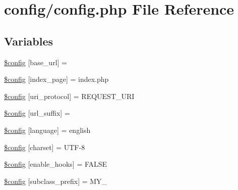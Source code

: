 \hypertarget{application_2config_2config_8php}{}\section{config/config.php File Reference}
\label{application_2config_2config_8php}
\subsection*{Variables}
\begin{DoxyCompactItemize}
\item 
\mbox{\hyperlink{application_2config_2config_8php_ab7d3dc1aba181a1198e7f26609046673}{\$config}} \mbox{[}\textquotesingle{}base\+\_\+url\textquotesingle{}\mbox{]} = \textquotesingle{}\textquotesingle{}
\item 
\mbox{\hyperlink{application_2config_2config_8php_a58f062e2a0bc777dad9a430970a7e50b}{\$config}} \mbox{[}\textquotesingle{}index\+\_\+page\textquotesingle{}\mbox{]} = \textquotesingle{}index.\+php\textquotesingle{}
\item 
\mbox{\hyperlink{application_2config_2config_8php_a7e0a80976b25629e97a7c93f1d278d99}{\$config}} \mbox{[}\textquotesingle{}uri\+\_\+protocol\textquotesingle{}\mbox{]} = \textquotesingle{}R\+E\+Q\+U\+E\+S\+T\+\_\+\+U\+RI\textquotesingle{}
\item 
\mbox{\hyperlink{application_2config_2config_8php_ad1183c73fa84c832075d7220c49dc6b2}{\$config}} \mbox{[}\textquotesingle{}url\+\_\+suffix\textquotesingle{}\mbox{]} = \textquotesingle{}\textquotesingle{}
\item 
\mbox{\hyperlink{application_2config_2config_8php_a36e8d14df9a48c1e0945975109946e8b}{\$config}} \mbox{[}\textquotesingle{}language\textquotesingle{}\mbox{]} = \textquotesingle{}english\textquotesingle{}
\item 
\mbox{\hyperlink{application_2config_2config_8php_a071d6716931a0a13a16629257e9ef345}{\$config}} \mbox{[}\textquotesingle{}charset\textquotesingle{}\mbox{]} = \textquotesingle{}U\+TF-\/8\textquotesingle{}
\item 
\mbox{\hyperlink{application_2config_2config_8php_ae152db70ca5fa75e4b1cea6ac02116de}{\$config}} \mbox{[}\textquotesingle{}enable\+\_\+hooks\textquotesingle{}\mbox{]} = F\+A\+L\+SE
\item 
\mbox{\hyperlink{application_2config_2config_8php_a815be6a457c426ff84d3a1c589c6853e}{\$config}} \mbox{[}\textquotesingle{}subclass\+\_\+prefix\textquotesingle{}\mbox{]} = \textquotesingle{}M\+Y\+\_\+\textquotesingle{}

\end{DoxyCompactItemize}
